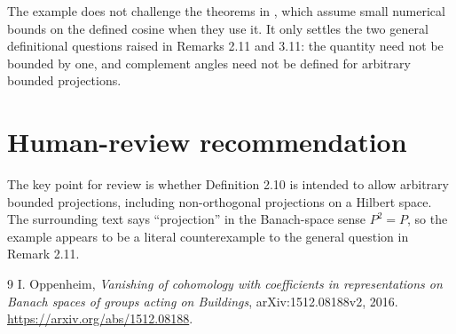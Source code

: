 \documentclass[11pt]{article}
\begin{document}
The example does not challenge the theorems in \cite{oppenheim1512}, which
assume small numerical bounds on the defined cosine when they use it.  It only
settles the two general definitional questions raised in Remarks 2.11 and 3.11:
the quantity need not be bounded by one, and complement angles need not be
defined for arbitrary bounded projections.

\section{Human-review recommendation}

The key point for review is whether Definition 2.10 is intended to allow
arbitrary bounded projections, including non-orthogonal projections on a
Hilbert space.  The surrounding text says ``projection'' in the Banach-space
sense \(P^2=P\), so the example appears to be a literal counterexample to the
general question in Remark 2.11.

\begin{thebibliography}{9}
I. Oppenheim,
\emph{Vanishing of cohomology with coefficients in representations on Banach
spaces of groups acting on Buildings},
arXiv:1512.08188v2, 2016.
\url{https://arxiv.org/abs/1512.08188}.
\end{thebibliography}
\end{document}
